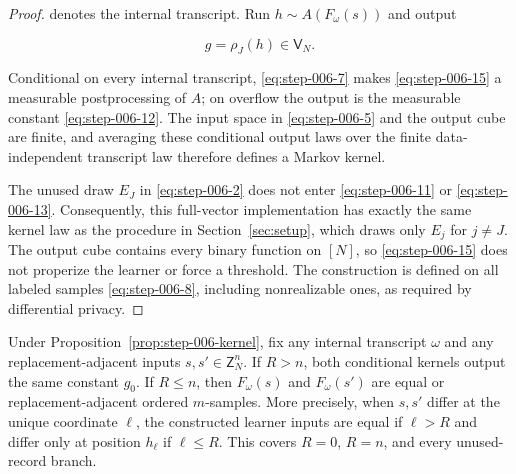 \begin{proof}
denotes the internal transcript. Run \(h \sim A(F_\omega(s))\) and output

\[
g=\rho_J(h)\in\mathsf V_N.
\tag{15}\label{eq:step-006-15}
\]

Conditional on every internal transcript, \eqref{eq:step-006-7} makes \eqref{eq:step-006-15} a measurable postprocessing of \(A\); on overflow the output is the measurable constant \eqref{eq:step-006-12}. The input space in \eqref{eq:step-006-5} and the output cube are finite, and averaging these conditional output laws over the finite data-independent transcript law therefore defines a Markov kernel.

The unused draw \(E_J\) in \eqref{eq:step-006-2} does not enter \eqref{eq:step-006-11} or \eqref{eq:step-006-13}. Consequently, this full-vector implementation has exactly the same kernel law as the procedure in Section~\ref{sec:setup}, which draws only \(E_j\) for \(j\ne J\). The output cube contains every binary function on \([N]\), so \eqref{eq:step-006-15} does not properize the learner or force a threshold. The construction is defined on all labeled samples \eqref{eq:step-006-8}, including nonrealizable ones, as required by differential privacy.

\end{proof}


\begin{lemma}
\label{lem:step-006-locality}

Under Proposition~\ref{prop:step-006-kernel}, fix any internal transcript \(\omega\) and any replacement-adjacent inputs \(s,s' \in \mathsf Z_N^n\). If \(R>n\), both conditional kernels output the same constant \(g_0\). If \(R\le n\), then \(F_\omega(s)\) and \(F_\omega(s')\) are equal or replacement-adjacent ordered \(m\)-samples. More precisely, when \(s,s'\) differ at the unique coordinate \(\ell\), the constructed learner inputs are equal if \(\ell>R\) and differ only at position \(h_\ell\) if \(\ell\le R\). This covers \(R=0\), \(R=n\), and every unused-record branch.

\end{lemma}

